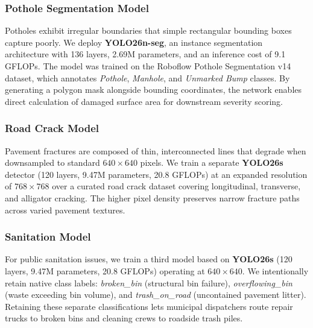 \subsubsection{Pothole Segmentation Model}
Potholes exhibit irregular boundaries that simple rectangular bounding boxes capture poorly. We deploy \textbf{YOLO26n-seg}, an instance segmentation architecture with 136 layers, 2.69M parameters, and an inference cost of 9.1 GFLOPs. The model was trained on the Roboflow Pothole Segmentation v14 dataset, which annotates \textit{Pothole}, \textit{Manhole}, and \textit{Unmarked Bump} classes. By generating a polygon mask alongside bounding coordinates, the network enables direct calculation of damaged surface area for downstream severity scoring.

\subsubsection{Road Crack Model}
Pavement fractures are composed of thin, interconnected lines that degrade when downsampled to standard $640\times 640$ pixels. We train a separate \textbf{YOLO26s} detector (120 layers, 9.47M parameters, 20.8 GFLOPs) at an expanded resolution of $768\times 768$ over a curated road crack dataset covering longitudinal, transverse, and alligator cracking. The higher pixel density preserves narrow fracture paths across varied pavement textures.

\subsubsection{Sanitation Model}
For public sanitation issues, we train a third model based on \textbf{YOLO26s} (120 layers, 9.47M parameters, 20.8 GFLOPs) operating at $640\times 640$. We intentionally retain native class labels: \textit{broken\_bin} (structural bin failure), \textit{overflowing\_bin} (waste exceeding bin volume), and \textit{trash\_on\_road} (uncontained pavement litter). Retaining these separate classifications lets municipal dispatchers route repair trucks to broken bins and cleaning crews to roadside trash piles.

\begin{table}[!t]
\caption{Architectural details of the integrated YOLO models}
\label{table:models}
\centering
{}
\end{table}

